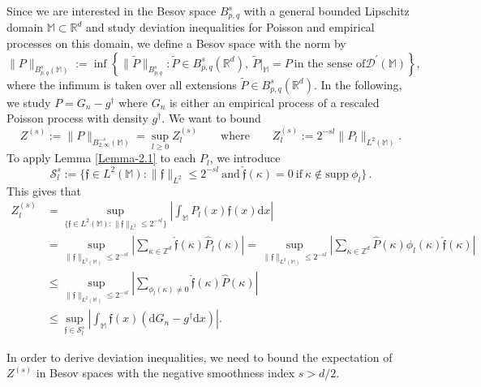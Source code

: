 \documentclass[10pt]{iopart}
\newcommand{\Zvar}{Z^{(s)}}
\newcommand{\Sset}{\mathcal{S}^{s}}
\begin{document}
\hspace{0.5cm}
Since we are interested in the Besov space $B_{p, q}^{s}$ with a general bounded Lipschitz domain $\mathbb{M}\subset \mathbb{R}^{d}$ and study deviation inequalities
for Poisson and empirical processes on this domain,  we define a Besov space with the norm by
\begin{equation*}
\|P\|_{B_{p, q}^{s}(\mathbb{M})}:=\inf\left\{\|\tilde{P}\|_{B_{p,q}^{s}}: \tilde{P}\in B_{p,q}^{s}(\mathbb{R}^{d}), ~ \tilde{P}|_{\mathbb{M}}=P~ \text{in the sense of} \mathscr{D}^{'}(\mathbb{M})\right\},
\end{equation*} 
where the infimum is taken over all extensions $\tilde{P}\in B_{p,q}^{s}(\mathbb{R}^{d})$. 
In the following, we study $P=G_{n}-g^{\dagger}$ where $G_n$ is either an empirical process of a rescaled Poisson process 
with density $g^{\dagger}$. We want to bound 
\begin{equation*}
\Zvar:=\|P\|_{B_{2, \infty}^{-s}(\mathbb{M})}=\sup_{l\geq 0}\Zvar_l
\qquad\mbox{where}\qquad 
\Zvar_l:=2^{-sl}\|P_{l}\|_{L^{2}(\mathbb{M})}.
\end{equation*}
To apply Lemma \ref{Lemma-2.1} to each $P_{l}$, we introduce
\[
\Sset_{l}:=\{\mathfrak{f}\in L^{2}(\mathbb{M}): 
\|\mathfrak{f}\|_{L^{2}}\leq 2^{-sl} ~\text{and}~\widehat{\mathfrak{f}}(\kappa)
=0~ \mbox{if}~ \kappa \notin\mbox{supp}~\phi_{l}\}\,.
\]
This gives that
\allowdisplaybreaks
\begin{align}\label{13}
\Zvar_l&%
=\sup_{\{\mathfrak{f}\in L^{2}(\mathbb{M}): \|\mathfrak{f}\|_{L^{2}}\leq 2^{-sl}\}}
\left|\int_{\mathbb{M}}P_{l}(x)\mathfrak{f}(x)\mathrm{d}x\right|\nonumber\\
&=\sup_{\|\mathfrak{f}\|_{L^{2}(\mathbb{M})}\leq 2^{-sl}}\left|\sum_{\kappa\in \mathbb{Z}^{d}}
\widehat{\mathfrak{f}}(\kappa)\widehat{P}_{l}(\kappa)\right|\nonumber
=\sup_{\|\mathfrak{f}\|_{L^{2}(\mathbb{M})}\leq 2^{-sl}}\left|\sum_{\kappa\in \mathbb{Z}^{d}}\widehat{P}(\kappa)\phi_{l}(\kappa)
\widehat{\mathfrak{f}}(\kappa)\right|\nonumber\\
&\leq \sup_{\|\mathfrak{f}\|_{L^{2}(\mathbb{M})}\leq 2^{-sl}}\left|\sum_{\phi_{l}(\kappa)\neq 0}\widehat{\mathfrak{f}}
(\kappa)\widehat{P}(\kappa)\right|\nonumber\\
&\leq \sup_{\mathfrak{f}\in \Sset_{l}}\left|\int_{\mathbb{M}}\mathfrak{f}(x)(\mathrm{d}G_{n}-g^{\dagger}\mathrm{d}x)\right|.
\end{align}

In order to derive deviation inequalities, we need to bound the expectation of $\Zvar$ in Besov spaces with the negative
smoothness index $s>d/2$.
\end{document}
